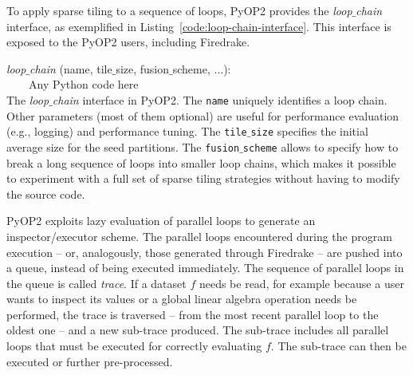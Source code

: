To apply sparse tiling to a sequence of loops, PyOP2 provides the {\em loop$\_$chain} interface, as exemplified in Listing~\ref{code:loop-chain-interface}. This interface is exposed to the PyOP2 users, including Firedrake. 

\begin{algorithm}[htpb]
\scriptsize\ttfamily
{}
 {\em loop$\_$chain} (name, tile$\_$size, fusion$\_$scheme, ...):\\
~~~~Any Python code here \\
\caption{The {\em loop$\_$chain} interface in PyOP2. The {\tt name} uniquely identifies a loop chain. Other parameters (most of them optional) are useful for performance evaluation (e.g., logging) and performance tuning. The {\tt tile$\_$size} specifies the initial average size for the seed partitions. The {\tt fusion$\_$scheme} allows to specify how to break a long sequence of loops into smaller loop chains, which makes it possible to experiment with a full set of sparse tiling strategies without having to modify the source code.}
\label{code:loop-chain-interface}
\end{algorithm}

PyOP2 exploits lazy evaluation of parallel loops to generate an inspector/executor scheme. The parallel loops encountered during the program execution -- or, analogously, those generated through Firedrake -- are pushed into a queue, instead of being executed immediately. The sequence of parallel loops in the queue is called {\em trace}. If a dataset $f$ needs be read, for example because a user wants to inspect its values or a global linear algebra operation needs be performed, the trace is traversed -- from the most recent parallel loop to the oldest one -- and a new sub-trace produced. The sub-trace includes all parallel loops that must be executed for correctly evaluating $f$. The sub-trace can then be executed or further pre-processed.

